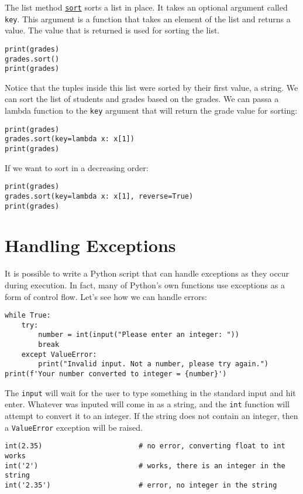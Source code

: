\documentclass[12pt, a4paper]{article}
\begin{document}
The list method \href{https://docs.python.org/3.6/library/stdtypes.html?highlight=list.sort\#list.sort}{\texttt{sort}} sorts a list in place.
It takes an optional argument called \texttt{key}.
This argument is a function that takes an element of the list and returns a value.
The value that is returned is used for sorting the list.
\lstset{language=jupyter-python,label= ,caption= ,captionpos=b,numbers=none}
\begin{lstlisting}
print(grades)
grades.sort()
print(grades)
\end{lstlisting}

Notice that the tuples inside this list were sorted by their first value, a string.
We can sort the list of students and grades based on the grades.
We can passa a lambda function to the \texttt{key} argument that will return the grade value for sorting:
\lstset{language=jupyter-python,label= ,caption= ,captionpos=b,numbers=none}
\begin{lstlisting}
print(grades)
grades.sort(key=lambda x: x[1])
print(grades)
\end{lstlisting}

If we want to sort in a decreasing order:
\lstset{language=jupyter-python,label= ,caption= ,captionpos=b,numbers=none}
\begin{lstlisting}
print(grades)
grades.sort(key=lambda x: x[1], reverse=True)
print(grades)
\end{lstlisting}
\section{Handling Exceptions}
\label{sec:org31c2bf8}
It is possible to write a Python script that can handle exceptions as they occur during execution.
In fact, many of Python's own functions use exceptions as a form of control flow.
Let's see how we can handle errors:
\lstset{language=jupyter-python,label= ,caption= ,captionpos=b,numbers=none}
\begin{lstlisting}
while True:
    try:
        number = int(input("Please enter an integer: "))
        break
    except ValueError:
        print("Invalid input. Not a number, please try again.")
print(f'Your number converted to integer = {number}')
\end{lstlisting}

The \texttt{input} will wait for the user to type something in the standard input and hit enter.
Whatever was inputed will come in as a string, and the \texttt{int} function will attempt to convert it to an integer.
If the string does not contain an integer, then a \texttt{ValueError} exception will be raised.
\lstset{language=jupyter-python,label= ,caption= ,captionpos=b,numbers=none}
\begin{lstlisting}
int(2.35)                       # no error, converting float to int works
int('2')                        # works, there is an integer in the string
int('2.35')                     # error, no integer in the string
\end{lstlisting}
\end{document}
